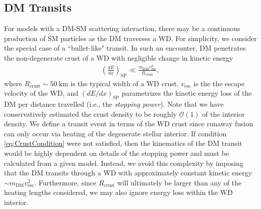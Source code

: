 \documentclass[twocolumn,showpacs,preprintnumbers,amsmath,amssymb,prd]{revtex4}
\newcommand{\OO}{\mathcal{O}}
\begin{document}
\subsection{DM Transits}
\label{sec:transit}
For models with a DM-SM scattering interaction, there may be a continuous production of SM particles as the DM traverses a WD.  For simplicity, we consider the special case of a ``bullet-like" transit. In such an encounter, DM penetrates the non-degenerate crust of a WD with negligible change in kinetic energy
\begin{align}
\label{eq:CrustCondition}
  \left( \frac{d E}{d x} \right)_\text{SP} \ll 
  \frac{m_\text{DM} v^2_\text{esc}}{R_\text{crust}},
\end{align}
where $R_\text{crust} \sim 50 ~\text{km}$ is the typical width of a WD crust, $v_\text{esc}$ is the the escape velocity of the WD, and $(dE/dx)_\text{SP}$ parametrizes the kinetic energy loss of the DM per distance travelled (i.e., the \emph{stopping power}).  Note that we have conservatively estimated the crust density to be roughly $\OO(1)$ of the interior density. We define a transit event in terms of the WD crust since runaway fusion can only occur via heating of the degenerate stellar interior.  If condition \eqref{eq:CrustCondition} were not satisfied, then the kinematics of the DM transit would be highly dependent on details of the stopping power and must be calculated from a given model. Instead, we avoid this complexity by imposing that the DM transits through a WD with approximately constant kinetic energy $\sim m_\text{DM} v^2_\text{esc}$. Furthermore, since $R_\text{crust}$ will ultimately be larger than any of the heating lengths considered, we may also ignore energy loss within the WD interior. 
\end{document}

